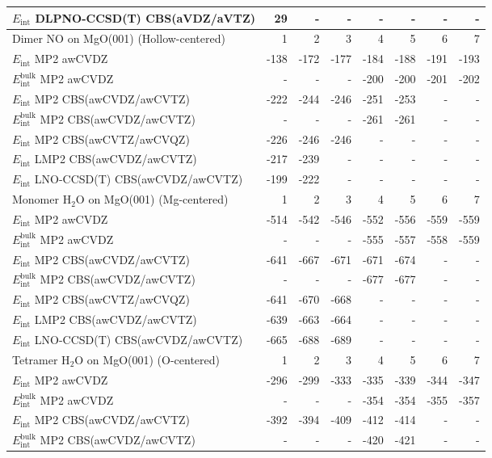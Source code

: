 \begin{longtable}{lrrrrrrr}
$E_\text{int}$ DLPNO-CCSD(T) CBS(aVDZ/aVTZ) & 29 & - & - & - & - & - & - \\
\toprule
Dimer NO on MgO(001) (Hollow-centered) & 1 & 2 & 3 & 4 & 5 & 6 & 7 \\ 
\midrule
$E_\text{int}$ MP2 awCVDZ & -138 & -172 & -177 & -184 & -188 & -191 & -193 \\
$E_\text{int}^\text{bulk}$ MP2 awCVDZ & - & - & - & -200 & -200 & -201 & -202 \\
$E_\text{int}$ MP2 CBS(awCVDZ/awCVTZ) & -222 & -244 & -246 & -251 & -253 & - & - \\
$E_\text{int}^\text{bulk}$ MP2 CBS(awCVDZ/awCVTZ) & - & - & - & -261 & -261 & - & - \\
$E_\text{int}$ MP2 CBS(awCVTZ/awCVQZ) & -226 & -246 & -246 & - & - & - & - \\
$E_\text{int}$ LMP2 CBS(awCVDZ/awCVTZ) & -217 & -239 & - & - & - & - & - \\
$E_\text{int}$ LNO-CCSD(T) CBS(awCVDZ/awCVTZ) & -199 & -222 & - & - & - & - & - \\
\toprule
Monomer H$_2$O on MgO(001) (Mg-centered) & 1 & 2 & 3 & 4 & 5 & 6 & 7 \\ 
\midrule
$E_\text{int}$ MP2 awCVDZ & -514 & -542 & -546 & -552 & -556 & -559 & -559 \\
$E_\text{int}^\text{bulk}$ MP2 awCVDZ & - & - & - & -555 & -557 & -558 & -559 \\
$E_\text{int}$ MP2 CBS(awCVDZ/awCVTZ) & -641 & -667 & -671 & -671 & -674 & - & - \\
$E_\text{int}^\text{bulk}$ MP2 CBS(awCVDZ/awCVTZ) & - & - & - & -677 & -677 & - & - \\
$E_\text{int}$ MP2 CBS(awCVTZ/awCVQZ) & -641 & -670 & -668 & - & - & - & - \\
$E_\text{int}$ LMP2 CBS(awCVDZ/awCVTZ) & -639 & -663 & -664 & - & - & - & - \\
$E_\text{int}$ LNO-CCSD(T) CBS(awCVDZ/awCVTZ) & -665 & -688 & -689 & - & - & - & - \\
\toprule
Tetramer H$_2$O on MgO(001) (O-centered) & 1 & 2 & 3 & 4 & 5 & 6 & 7 \\ 
\midrule
$E_\text{int}$ MP2 awCVDZ & -296 & -299 & -333 & -335 & -339 & -344 & -347 \\
$E_\text{int}^\text{bulk}$ MP2 awCVDZ & - & - & - & -354 & -354 & -355 & -357 \\
$E_\text{int}$ MP2 CBS(awCVDZ/awCVTZ) & -392 & -394 & -409 & -412 & -414 & - & - \\
$E_\text{int}^\text{bulk}$ MP2 CBS(awCVDZ/awCVTZ) & - & - & - & -420 & -421 & - & - \\

\end{longtable}
